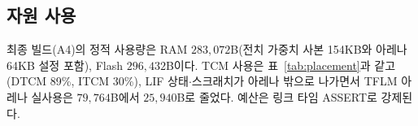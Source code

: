 \subsection{자원 사용}

최종 빌드(A4)의 정적 사용량은 RAM $283{,}072$B(전치 가중치 사본
154KB와 아레나 64KB 설정 포함), Flash $296{,}432$B이다. TCM 사용은
표~\ref{tab:placement}과 같고(DTCM 89\%, ITCM 30\%), LIF
상태$\cdot$스크래치가 아레나 밖으로 나가면서 TFLM 아레나 실사용은
$79{,}764$B에서 $25{,}940$B로 줄었다. 예산은 링크 타임 ASSERT로
강제된다.
